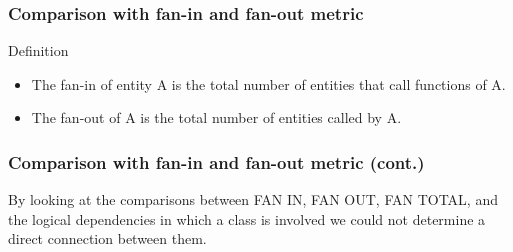 \documentclass{beamer}
\begin{document}

 \begin{frame}
\frametitle{Comparison with fan-in and fan-out metric}
\begin{block}{Definition}


\begin{itemize}
\item The fan-in of entity A is the total number of entities that call functions of A.
\item The fan-out of A is the total number of entities called by A.
\end{itemize}

\end{block}
\end{frame}



 \begin{frame}
\frametitle{Comparison with fan-in and fan-out metric (cont.)}
By looking at the comparisons between FAN IN, FAN OUT, FAN TOTAL, and the logical dependencies in which a class is involved we could not determine a direct connection between them.

\begin{table}[!h]
\renewcommand{\arraystretch}{1}
\caption{Top 10 LD measurements for Ant. }
\label{tab:measurementstop:ant}
\centering
{}
\end{table}

\end{frame}
\end{document}
